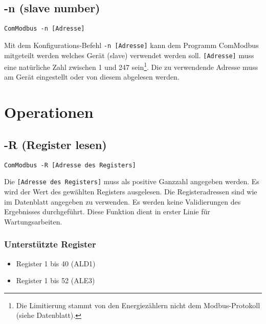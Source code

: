 \documentclass[Bachelorarbeit.tex]{subfiles}
\begin{document}
\subsection*{-n (slave number)}
\begin{verbatim}
ComModbus -n [Adresse]
\end{verbatim}
Mit dem Konfigurations-Befehl \texttt{-n [Adresse]} kann dem Programm ComModbus 
mitgeteilt werden welches Gerät (slave) verwendet werden soll. \texttt{[Adresse]} muss 
eine natürliche Zahl zwischen 1 und 247 sein\footnote{Die Limitierung stammt von den Energiezählern nicht dem Modbus-Protokoll (siehe Datenblatt).}. Die zu verwendende Adresse muss 
am Gerät eingestellt oder von diesem abgelesen werden.

\newpage

\section{Operationen}

\subsection*{-R (Register lesen)}
\begin{verbatim}
ComModbus -R [Adresse des Registers]
\end{verbatim}
\begin{comment}
Die Adresse des Registers muss als positive Ganzzahl angegeben werden. Es wird 
der Wert des gewählten Registers ausgelesen. Die Registeradressen sind wie im 
Datenblatt angegeben zu verwenden. Es werden keine Validierungen des 
Ergebnisses durchgeführt. Diese Funktion dient in erster Linie Wartungsarbeiten.
\end{comment}
Die \texttt{[Adresse des Registers]} muss als positive Ganzzahl angegeben werden. Es wird der Wert des gewählten Registers ausgelesen. Die Registeradressen sind wie im Datenblatt angegeben zu verwenden. Es werden keine Validierungen des 
Ergebnisses durchgeführt. Diese Funktion dient in erster Linie für Wartungsarbeiten.\\

\subsubsection*{Unterstützte Register}
\begin{itemize}
\itemsep0em
\item Register 1 bis 40 (ALD1)
\item Register 1 bis 52 (ALE3)
\end{itemize}
\end{document}

